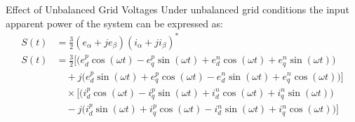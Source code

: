 \documentclass[aspectratio=169]{beamer}
\begin{document}
\begin{frame}{Effect of Unbalanced Grid Voltages}
    Under unbalanced grid conditions the input apparent power of the system can be expressed as:
    \begin{equation*}
        \begin{split}
            S(t) &= \frac{3}{2}(e_{\alpha} + je_{\beta})(i_{\alpha} + ji_{\beta})^{*} \\
            S(t) &= \frac{3}{2}\Big[ \big(e_{d}^{p}\cos(\omega t) - e_{q}^{p}\sin(\omega t) + e_{d}^{n}\cos(\omega t) + e_{q}^{n}\sin(\omega t)\big) \\
            &\quad + j\big(e_{d}^{p}\sin(\omega t) + e_{q}^{p}\cos(\omega t) - e_{d}^{n}\sin(\omega t) + e_{q}^{n}\cos(\omega t)\big) \Big] \\
            &\quad \times \Big[ \big(i_{d}^{p}\cos(\omega t) - i_{q}^{p}\sin(\omega t) + i_{d}^{n}\cos(\omega t) + i_{q}^{n}\sin(\omega t)\big) \\
            &\quad - j\big(i_{d}^{p}\sin(\omega t) + i_{q}^{p}\cos(\omega t) - i_{d}^{n}\sin(\omega t) + i_{q}^{n}\cos(\omega t)\big)\Big]
        \end{split}
    \end{equation*}
\end{frame}
\end{document}
